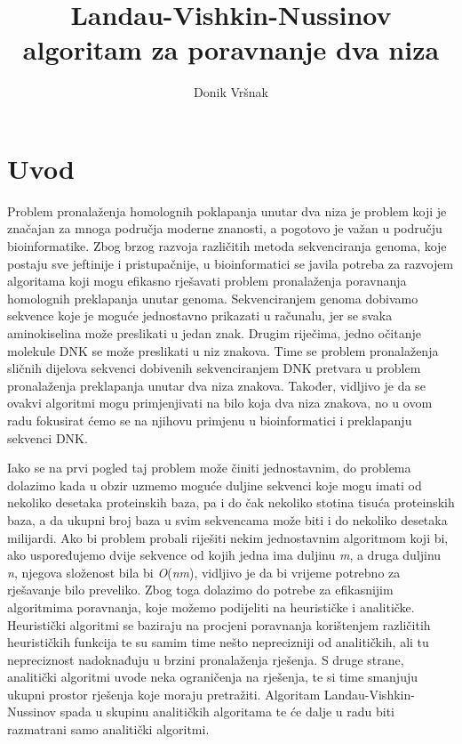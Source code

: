 \documentclass[times, utf8, zavrsni]{fer}
\begin{document}

\title{Landau-Vishkin-Nussinov algoritam za poravnanje dva niza}

\author{Donik Vršnak}

\maketitle


\zahvala{}

\tableofcontents

\chapter{Uvod}
Problem pronalaženja homolognih poklapanja unutar dva niza je problem koji je značajan za mnoga područja moderne znanosti, a pogotovo je važan u području bioinformatike. Zbog brzog razvoja različitih metoda sekvenciranja genoma, koje postaju sve jeftinije i pristupačnije, u bioinformatici se javila potreba za razvojem algoritama koji mogu efikasno rješavati problem pronalaženja poravnanja homolognih preklapanja unutar genoma. Sekvenciranjem genoma dobivamo sekvence koje je moguće jednostavno prikazati u računalu, jer se svaka aminokiselina može preslikati u jedan znak. Drugim riječima, jedno očitanje molekule DNK se može preslikati u niz znakova. Time se problem pronalaženja sličnih dijelova sekvenci dobivenih sekvenciranjem DNK pretvara u problem pronalaženja preklapanja unutar dva niza znakova. Također, vidljivo je da se ovakvi algoritmi mogu primjenjivati na bilo koja dva niza znakova, no u ovom radu fokusirat ćemo se na njihovu primjenu u bioinformatici i preklapanju sekvenci DNK.

Iako se na prvi pogled taj problem može činiti jednostavnim, do problema dolazimo kada u obzir uzmemo moguće duljine sekvenci koje mogu imati od nekoliko desetaka proteinskih baza, pa i do čak nekoliko stotina tisuća proteinskih baza, a da ukupni broj baza u svim sekvencama može biti i do nekoliko desetaka milijardi. Ako bi problem probali riješiti nekim jednostavnim algoritmom koji bi, ako uspoređujemo dvije sekvence od kojih jedna ima duljinu \textit{m}, a druga duljinu \textit{n}, njegova složenost bila bi \textit{O}(\textit{nm}), vidljivo je da bi vrijeme potrebno za rješavanje bilo preveliko. Zbog toga dolazimo do potrebe za efikasnijim algoritmima poravnanja, koje možemo podijeliti na heurističke i analitičke. Heuristički algoritmi se baziraju na procjeni poravnanja korištenjem različitih heurističkih funkcija te su samim time nešto neprecizniji od analitičkih, ali tu nepreciznost nadoknađuju u brzini pronalaženja rješenja. S druge strane, analitički algoritmi uvode neka ograničenja na rješenja, te si time smanjuju ukupni prostor rješenja koje moraju pretražiti. Algoritam Landau-Vishkin-Nussinov spada u skupinu analitičkih algoritama te će dalje u radu biti razmatrani samo analitički algoritmi.
\end{document}
